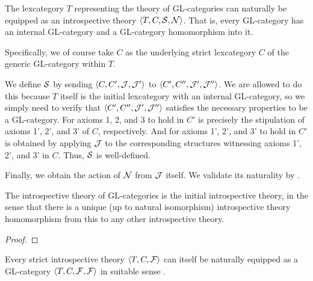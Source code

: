 \begin{construction}
The lexcategory $T$ representing the theory of GL-categories can naturally be equipped as an introspective theory $\langle T, C, \mathcal{S}, \mathcal{N} \rangle$. That is, every GL-category has an internal GL-category and a GL-category homomorphism into it.

Specifically, we of course take $C$ as the underlying strict lexcategory $C$ of the generic GL-category within $T$.

We define $\mathcal{S}$ by sending $\langle C, C', \mathcal{J}, \mathcal{J}' \rangle$ to $\langle C', C'', \mathcal{J}', \mathcal{J}'' \rangle$. We are allowed to do this because $T$ itself is the initial lexcategory with an internal GL-category, so we simply need to verify that $\langle C', C'', \mathcal{J}', \mathcal{J}'' \rangle$ satisfies the necessary properties to be a GL-category. For axioms 1, 2, and 3 to hold in $C'$ is precisely the stipulation of axioms 1', 2', and 3' of $C$, respectively. And for axioms 1', 2', and 3' to hold in $C'$ is obtained by applying $\mathcal{J}$ to the corresponding structures witnessing axioms 1', 2', and 3' in $C$. Thus, $\mathcal{S}$ is well-defined.

Finally, we obtain the action of $\mathcal{N}$ from $\mathcal{J}$ itself. We validate its naturality by \TODO.


\end{construction}

\begin{theorem}
The introspective theory of GL-categories is the initial introspective theory, in the sense that there is a unique (up to natural isomorphism) introspective theory homomorphism from this to any other introspective theory.
\end{theorem}
\begin{proof}
\TODO
\end{proof}

\begin{construction}
Every strict introspective theory $\langle T, C, \mathcal{F} \rangle$ can itself be naturally equipped as a GL-category $\langle T, C, \mathcal{F}, \mathcal{F} \rangle$ in suitable sense \TODO.
\end{construction}

